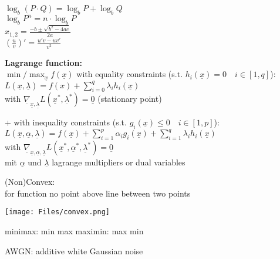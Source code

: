 \documentclass[a4paper,10pt,landscape]{article}
\newcommand{\x}{\underline{x}}
\begin{document}
\begin{multicols}{3}
    $\log_b(P \cdot Q) = \log_b P + \log_b Q $\\
    $\log_b P^n = n \cdot \log_b P$\\
    ${\displaystyle x_{1,2}={\frac {-b\pm {\sqrt {b^{2}-4ac}}}{2a}}}$\\
    $(\frac{u}{v})' = \frac{u'v - uv'}{v^2}$
    
    \textbf{Lagrange function:}\\
    $\min/\max_{\x} f(\x)$ with equality constraints (s.t. $h_i(\x)=0 \quad i\in[1,q]$):\\
    $ L(\x, \underline{\lambda}) = f(x) + \sum_{i=0}^q \lambda_i h_i(\x) $\\
    with $\underline{\nabla}_{\x, \underline{\lambda}}L(\x^*,\underline{\lambda}^*) = \underline{0} $ (stationary point)
    
    + with inequality constraints (s.t. $g_i(\x)\leq 0 \quad i\in[1,p]$):
    $L(\x, \underline{\alpha}, \underline{\lambda}) = f(\x) + \sum_{i=1}^p\alpha_i g_i(\x) + \sum_{i=1}^q \lambda_i h_i(\x)$\\
    with $\underline{\nabla}_{\x, \underline{\alpha}, \underline{\lambda}}L(\x^*, \underline{\alpha}^*,\underline{\lambda}^*) = \underline{0} $ \\
    mit $\underline{\alpha}$ und $\underline{\lambda}$
    lagrange multipliers or dual variables


    \begin{minipage}{0.22\textwidth}
         (Non)Convex:\\
        for function no point above line between two points
    \end{minipage}
    \begin{minipage}{0.1\textwidth}
         \texttt{[image: Files/convex.png]}
    \end{minipage}

    minimax: min max \hspace{10pt} maximin: max min

    AWGN: additive white Gaussian noise


    \vfill\null    %
    \columnbreak

    

\end{multicols}
\end{document}
